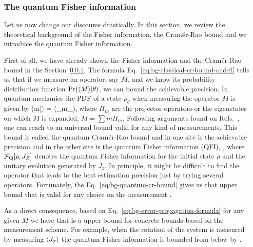 \subsubsection{The quantum Fisher information}

Let us now change our discourse drastically.
In this section, we review the theoretical background of the Fisher information, the Cram\'er-Rao bound and we introduce the quantum Fisher information.

First of all, we have already shown the Fisher information and the Cram\'er-Rao bound in the Section~\ref{}.
The formula Eq.~\eqref{eq:bg-classical-cr-bound-and-fi} tells us that if we measure an operator, say $M$, and we know its probability distribution function $\text{Pr}(\langle M \rangle|\theta)$, we can bound the achievable precision.
In quantum mechanics the PDF of a state $\rho_\theta$ when measuring the operator $M$ is given by
\be
  \prob(m|\theta) = \tr({\Pi_{m}\rho_\theta}),
\ee
where $\Pi_{m}$ are the projector operators or the eigenstates on which $M$ is expanded, $M = \sum m \Pi_m$.
Following arguments found on Refs.~\citep{Paris2009, }, one can reach to an universal bound valid for any kind of measurements.
This bound is called the quantum Cram\'er-Rao bound and in one site is the achievable precision and in the other site is the quantum Fisher information (QFI),
\be
  \label{eq:bg-quantum-cr-bound}
  \varinv{\theta} \leq \qfi[\rho,J_z],
\ee
where $\mathcal{F}_{\textnormal{Q}}[\rho, J_Z]$ denotes the quantum Fisher information for the initial state $\rho$ and the unitary evolution generated by $J_z$.
In principle, it might be difficult to find the operator that leads to the best estimation precision just by trying several operators.
Fortunately, the Eq.~\eqref{eq:bg-quantum-cr-bound} gives us that upper bound that is valid for any choice on the measurement \citep{MR87, MR88}.

As a direct consequence, based on Eq.~\eqref{eq:bg-error-propagation-formula} for any given $M$ we have that
\be
  \qfi[\rho,J_z] \geq {}
\ee
is a upper bound for concrete bounds based on the measurement scheme.
For example, when the rotation of the system is measured by measuring $\langle J_x \rangle$ the quantum Fisher information is bounded from below by \citep{Pezze2002}
\be
  \label{eq:bg-pezze-bound}
  \qfi[\rho,J_z] \geq {}.
\ee

